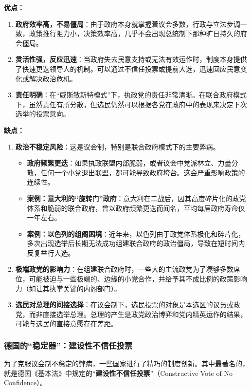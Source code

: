 \textbf{优点：}

\begin{enumerate}
    \item \textbf{政府效率高，不易僵局}：由于政府本身就掌握着议会多数，行政与立法步调一致，政策推行阻力小，决策效率高，几乎不会出现总统制下那种旷日持久的府会僵局。
    \item \textbf{灵活性强，反应迅速}：当政府失去民意支持或无法有效运作时，制度本身提供了快速更迭领导人的机制。可以通过不信任投票或提前大选，迅速回应民意变化或解决政治危机。
    \item \textbf{责任明确}：在“威斯敏斯特模式”下，执政党的责任非常清晰。在联合政府模式下，虽然责任有所分散，但选民仍然可以根据各党在政府中的表现来决定下次选举的投票意向。
\end{enumerate}

\textbf{缺点：}

\begin{enumerate}
    \item \textbf{政治不稳定风险}：这是议会制，特别是联合政府模式下的主要弊病。
    \begin{itemize}
        \item \textbf{政府频繁更迭}：如果执政联盟内部脆弱，或者议会中党派林立、力量分散，任何一个小党退出联盟，都可能导致政府垮台。这会严重影响政策的连续性。
        \item \textbf{案例：意大利的“旋转门”政府}：意大利在二战后，因其高度碎片化的政党体系和脆弱的联合政府，曾以政府频繁更迭而闻名，平均每届政府寿命仅一年左右。
        \item \textbf{案例：以色列的组阁困境}：近年来，以色列由于政党体系极化和碎片化，多次出现选举后长期无法成功组建联合政府的政治僵局，导致在短时间内反复举行大选。
    \end{itemize}
    \item \textbf{极端政党的影响力}：在组建联合政府时，一些大的主流政党为了凑够多数席位，可能被迫与一些极端的、边缘的小党合作，并给予其不成比例的政策影响力（如让其执掌关键的内阁部门）。
    \item \textbf{选民对总理的间接选择}：在议会制下，选民投票的对象是本选区的议员或政党，而非直接选举总理。总理的产生是政党政治博弈和党内精英运作的结果，可能与选民的直接意愿存在差距。
\end{enumerate}

\subsubsection*{德国的“稳定器”：建设性不信任投票}

为了克服议会制不稳定的弊病，一些国家进行了精巧的制度创新。其中最著名的，就是德国《基本法》中规定的“\textbf{建设性不信任投票}”（Constructive Vote of No Confidence）。

